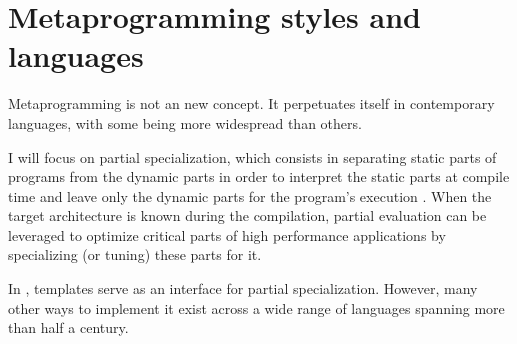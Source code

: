 \documentclass[../main]{subfiles}
\begin{document}

\section{
  Metaprogramming styles and languages
}

Metaprogramming is not an new concept. It perpetuates itself in contemporary
languages, with some being more widespread than others.

I will focus on partial specialization, which consists in separating
static parts of programs from the dynamic parts in order to interpret
the static parts at compile time and leave only the dynamic parts for the
program's execution \cite{10.1145/243439.243447, 10.1023/A:1010095604496}.
When the target architecture is known during the compilation, partial evaluation
can be leveraged to optimize critical parts of high performance applications
by specializing (or tuning) these parts for it.

In \cpp, templates serve as an interface for partial specialization.
However, many other ways to implement it exist across a wide range of languages
spanning more than half a century.


\end{document}
